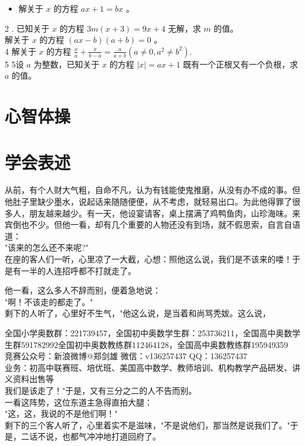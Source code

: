 \documentclass[10pt]{article}
\begin{document}
\begin{itemize}
  \item 解关于 $x$ 的方程 $a x+1=b x$ 。
\end{itemize}

2 . 已知关于 $x$ 的方程 $3 m(x+3)=9 x+4$ 无解，求 $m$ 的值。\\
解关于 $x$ 的方程 $(a x-b)(a+b)=0$ 。\\
4 解关于 $x$ 的方程 $\frac{x}{a}+\frac{x}{b-a}=\frac{a}{a+b}\left(a \neq 0, a^{2} \neq b^{2}\right)$.\\
5 5设 $a$ 为整数，已知关于 $x$ 的方程 $|x|=a x+1$ 既有一个正根又有一个负根，求 $a$ 的值。

\section*{心智体操}
\section*{学会表述}
从前，有个人财大气粗，自命不凡，认为有钱能使鬼推磨，从没有办不成的事。但他肚子里缺少墨水，说起话来随随便便，从不考虑，就轻易出口。为此他得罪了很多人，朋友越来越少。有一天，他设宴请客，桌上摆满了鸡鸭鱼肉，山珍海味。来宾倒也不少。但他一看，却有几个重要的人物还没有到场，就不假思索，自言自语道：\\
"该来的怎么还不来呢?"\\
在座的客人们一听，心里凉了一大截，心想：照他这么说，我们是不该来的喽！于是有一半的人连招呼都不打就走了。

他一看，这么多人不辞而别，便着急地说：\\
"啊！不该走的都走了。"\\
剩下的人听了，心里好不生气，"他这么说，是当着和尚骂秃妭。这么说，

全国小学奥数群：221739457，全国初中奥数学生群：253736211，全国高中奥数学生群591782992全国初中奥数教练群112464128，全国高中奥数教练群195949359\\
竞赛公众号：新浪微博@郑剑雄 微信：v136257437 QQ：136257437\\
业务：初高中联赛班、培优班、美国高中数学、教师培训、机构教学产品研发、讲义资料出售等\\
我们是该走了！"于是，又有三分之二的人不告而别。\\
一看这阵势，这位东道主急得直拍大腿：\\
"这，这，我说的不是他们啊！"\\
剩下的三个客人听了，心里着实不是滋味，"不是说他们，那当然是说我们了。"于是，二话不说，也都气冲冲地打道回府了。
\end{document}

